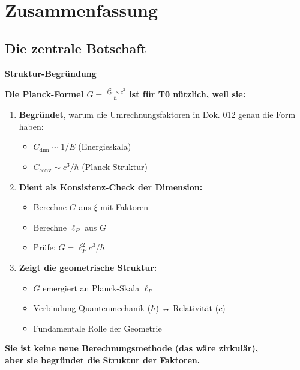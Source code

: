 	\section{Zusammenfassung}
	
	\subsection{Die zentrale Botschaft}
	
	\begin{key}
		\textbf{Struktur-Begründung}\par\medskip
		\textbf{Die Planck-Formel $G = \frac{\ell_P^2 \times c^3}{\hbar}$ ist für T0 nützlich, weil sie:}
		
		\begin{enumerate}
			\item \textbf{Begründet}, warum die Umrechnungsfaktoren in Dok. 012 genau die Form haben:
			\begin{itemize}
				\item $C_{\text{dim}} \sim 1/E$ (Energieskala)
				\item $C_{\text{conv}} \sim c^3/\hbar$ (Planck-Struktur)
			\end{itemize}
			
			\item \textbf{Dient als Konsistenz-Check der Dimension:}
			\begin{itemize}
				\item Berechne $G$ aus $\xi$ mit Faktoren
				\item Berechne $\ell_P$ aus $G$
				\item Prüfe: $G = \ell_P^2 c^3/\hbar$
			\end{itemize}
			
			\item \textbf{Zeigt die geometrische Struktur:}
			\begin{itemize}
				\item $G$ emergiert an Planck-Skala $\ell_P$
				\item Verbindung Quantenmechanik ($\hbar$) ↔ Relativität ($c$)
				\item Fundamentale Rolle der Geometrie
			\end{itemize}
		\end{enumerate}
		
		\textbf{Sie ist keine neue Berechnungsmethode (das wäre zirkulär), \\
			aber sie begründet die Struktur der Faktoren.}
	\end{key}
	
